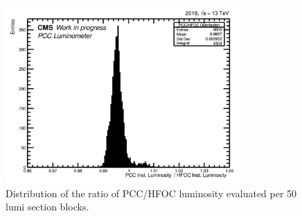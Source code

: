 \begin{itemize}
\begin{figure}[!htp]
\centering
\includegraphics[width=0.8\textwidth]{ashish_thesis/ProjY_ProfileX_h_ratio_all_1.png}
\caption[Projection Of Luminosity Ratio Profile]{%
Distribution of the ratio of PCC/HFOC luminosity evaluated per 50 lumi section blocks. 
}
\label{fig:stabprof1}
\end{figure}
  


\end{itemize}
